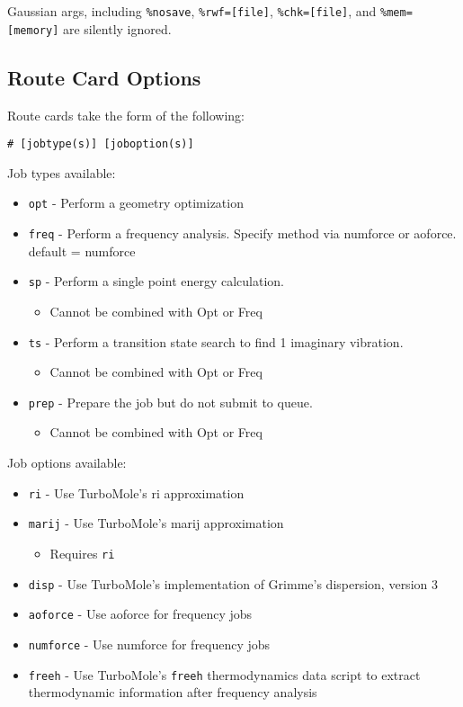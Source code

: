Gaussian args, including \texttt{\%nosave}, \texttt{\%rwf={[}file{]}}, \texttt{\%chk={[}file{]}}, and \texttt{\%mem={[}memory{]}} are silently ignored.

\subsection{Route Card Options}

Route cards take the form of the following:

\texttt{\# {[}jobtype(s){]} {[}joboption(s){]}}

Job types available:

\begin{itemize}
\item \texttt{opt} - Perform a geometry optimization
\item \texttt{freq} - Perform a frequency analysis. Specify method via numforce or aoforce. default = numforce
\item \texttt{sp} - Perform a single point energy calculation.
  \begin{itemize}
    \item Cannot be combined with Opt or Freq
  \end{itemize}
\item \texttt{ts} - Perform a transition state search to find 1 imaginary vibration. 
  \begin{itemize}
    \item Cannot be combined with Opt or Freq
  \end{itemize}
\item \texttt{prep} - Prepare the job but do not submit to queue.
  \begin{itemize}
    \item Cannot be combined with Opt or Freq
  \end{itemize}
\end{itemize}

Job options available:

\begin{itemize}
\item \texttt{ri} - Use TurboMole's ri approximation
\item \texttt{marij} - Use TurboMole's marij approximation 
  \begin{itemize}
    \item Requires \texttt{ri}
  \end{itemize}
\item \texttt{disp} - Use TurboMole's implementation of Grimme's dispersion, version 3
\item \texttt{aoforce} - Use aoforce for frequency jobs
\item \texttt{numforce} - Use numforce for frequency jobs
\item \texttt{freeh} - Use TurboMole's \texttt{freeh} thermodynamics data script to extract thermodynamic information after frequency analysis
\end{itemize}

